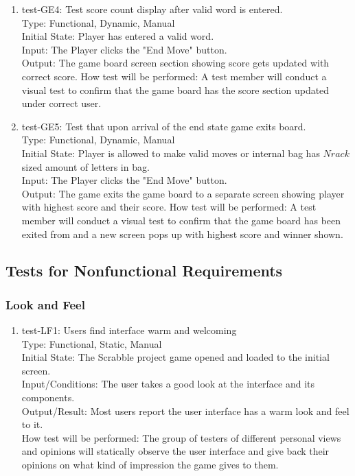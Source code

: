\documentclass[12pt, titlepage]{article}
\begin{document}
\begin{enumerate}
    \item{test-GE4: Test score count display after valid word is entered.\\} %
    Type: Functional, Dynamic, Manual\\
    Initial State: Player has entered a valid word. \\
    Input: The Player clicks the "End Move" button.\\
    Output: The game board screen section showing score gets updated with correct score.
    How test will be performed: A test member will conduct a visual test to confirm that the game board has the score section updated under correct user.\\
    
    \item{test-GE5: Test that upon arrival of the end state game exits board.\\} %
    Type: Functional, Dynamic, Manual\\
    Initial State: Player is allowed to make valid moves or internal bag has $N rack$ sized amount of letters in bag. \\
    Input: The Player clicks the "End Move" button.\\
    Output: The game exits the game board to a separate screen showing player with highest score and their score.
    How test will be performed: A test member will conduct a visual test to confirm that the game board has been exited from and a new screen pops up with highest score and winner shown.\\
\end{enumerate}
    
\subsection{Tests for Nonfunctional Requirements}%

\subsubsection{Look and Feel}
\begin{enumerate}

\item{test-LF1: Users find interface warm and welcoming}\\
    Type: Functional, Static, Manual\\
    Initial State: The Scrabble project game opened and loaded to the initial screen.\\
    Input/Conditions: The user takes a good look at the interface and its components.\\
    Output/Result: Most users report the user interface has a warm look and feel to it.\\
    How test will be performed: The group of testers of different personal views and opinions will statically observe the user interface and give back their opinions on what kind of impression the game gives to them.\\
\end{enumerate}
\end{document}
